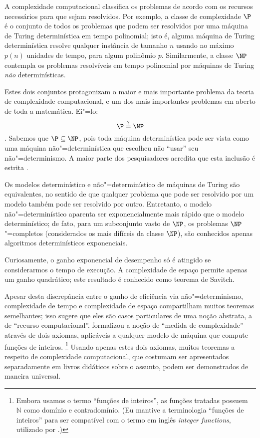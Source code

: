 A complexidade computacional classifica os problemas
de acordo com os recursos necessários para que sejam resolvidos.
Por exemplo,
a classe de complexidade $\P$
é o conjunto de todos os problemas que podem ser resolvidos
por uma máquina de Turing determinística
em tempo polinomial;
isto é,
alguma máquina de Turing determinística
resolve qualquer instância de tamanho $n$
usando no máximo $p(n)$ unidades de tempo,
para algum polinômio $p$.
Similarmente,
a classe $\NP$
contempla os problemas resolvíveis em tempo polinomial
por máquinas de Turing \emph{não} determinísticas.

Estes dois conjuntos protagonizam
o maior e mais importante problema da teoria de complexidade computacional,
e um dos mais importantes problemas em aberto de toda a matemática.
Ei"=lo:
\begin{displaymath}
    \P \stackrel?= \NP
\end{displaymath}
\cite[p.~270]{Sipser2006}.
Sabemos que $\P \subseteq \NP$,
pois toda máquina determinística pode ser vista como
uma máquina não"=determinística que escolheu não ``usar''
seu não"=determinismo.
A maior parte dos pesquisadores acredita que
esta inclusão é estrita \cite[p.~2]{Gasarch2012}.

Os modelos determinístico e não"=determinístico de máquinas de Turing são equivalentes,
no sentido de que qualquer problema que pode ser resolvido por um modelo
também pode ser resolvido por outro.
Entretanto, o modelo não"=determinístico
aparenta ser exponencialmente mais rápido que
o modelo determinístico;
de fato, para um subconjunto vasto de $\NP$,
os problemas $\NP$"=completos
(considerados os mais difíceis da classe $\NP$),
são conhecidos apenas algoritmos determinísticos exponenciais.

Curiosamente,
o ganho exponencial de desempenho
só é atingido se considerarmos o tempo de execução.
A complexidade de espaço permite apenas um ganho quadrático;
este resultado é conhecido como teorema de Savitch.

Apesar desta discrepância entre o ganho de eficiência via não"=determinismo,
complexidade de tempo e complexidade de espaço
compartilham muitos teoremas semelhantes;
isso sugere que eles são casos particulares de uma noção abstrata,
a de ``recurso computacional''.
 formalizou a noção de ``medida de complexidade''
através de dois axiomas,
aplicáveis a qualquer modelo de máquina que compute funções de inteiros.%
\footnote{
    Embora usamos o termo ``funções de inteiros'',
    as funções tratadas possuem~$\mathbb N$ como domínio e contradomínio.
    (Eu mantive a terminologia ``funções de inteiros''
    para ser compatível com o termo em inglês \emph{integer functions},
    utilizado por .)
}
Usando apenas estes dois axiomas,
muitos teoremas a respeito de complexidade computacional,
que costumam ser apresentados separadamente em livros didáticos sobre o assunto,
podem ser demonstrados de maneira universal.

